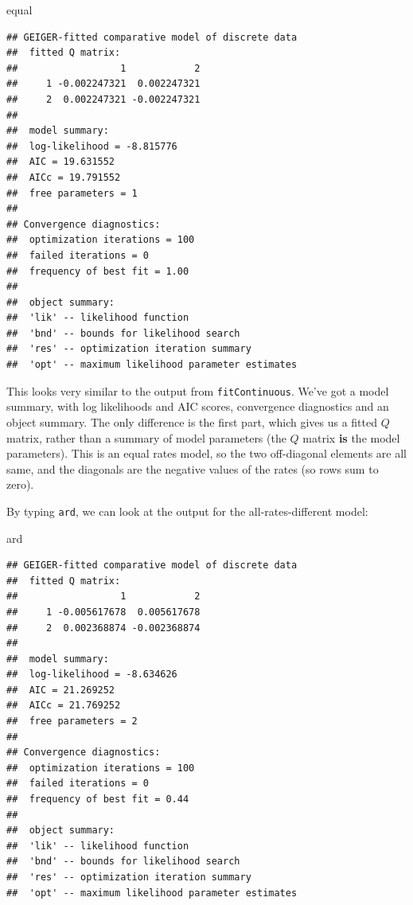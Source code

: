 \documentclass[]{book}
\newenvironment{Shaded}{\begin{snugshade}}{\end{snugshade}}
\newcommand{\NormalTok}[1]{{#1}}
\begin{document}
\begin{Shaded}
\begin{Highlighting}[]
\NormalTok{equal}
\end{Highlighting}
\end{Shaded}

\begin{verbatim}
## GEIGER-fitted comparative model of discrete data
##  fitted Q matrix:
##                  1            2
##     1 -0.002247321  0.002247321
##     2  0.002247321 -0.002247321
## 
##  model summary:
##  log-likelihood = -8.815776
##  AIC = 19.631552
##  AICc = 19.791552
##  free parameters = 1
## 
## Convergence diagnostics:
##  optimization iterations = 100
##  failed iterations = 0
##  frequency of best fit = 1.00
## 
##  object summary:
##  'lik' -- likelihood function
##  'bnd' -- bounds for likelihood search
##  'res' -- optimization iteration summary
##  'opt' -- maximum likelihood parameter estimates
\end{verbatim}

This looks very similar to the output from \texttt{fitContinuous}. We've
got a model summary, with log likelihoods and AIC scores, convergence
diagnostics and an object summary. The only difference is the first
part, which gives us a fitted \(Q\) matrix, rather than a summary of
model parameters (the \(Q\) matrix \textbf{is} the model parameters).
This is an equal rates model, so the two off-diagonal elements are all
same, and the diagonals are the negative values of the rates (so rows
sum to zero).

By typing \texttt{ard}, we can look at the output for the
all-rates-different model:

\begin{Shaded}
\begin{Highlighting}[]
\NormalTok{ard}
\end{Highlighting}
\end{Shaded}

\begin{verbatim}
## GEIGER-fitted comparative model of discrete data
##  fitted Q matrix:
##                  1            2
##     1 -0.005617678  0.005617678
##     2  0.002368874 -0.002368874
## 
##  model summary:
##  log-likelihood = -8.634626
##  AIC = 21.269252
##  AICc = 21.769252
##  free parameters = 2
## 
## Convergence diagnostics:
##  optimization iterations = 100
##  failed iterations = 0
##  frequency of best fit = 0.44
## 
##  object summary:
##  'lik' -- likelihood function
##  'bnd' -- bounds for likelihood search
##  'res' -- optimization iteration summary
##  'opt' -- maximum likelihood parameter estimates
\end{verbatim}
\end{document}
